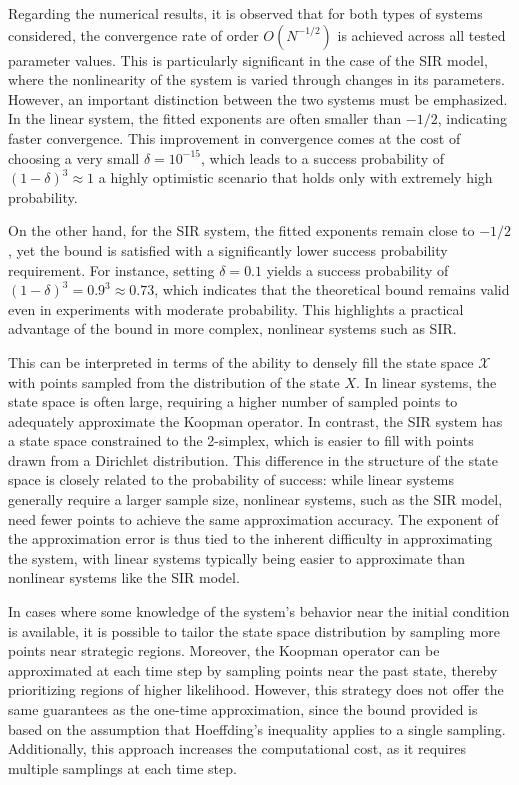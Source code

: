 \documentclass{article}
\begin{document}
Regarding the numerical results, it is observed that for both types of systems considered, the convergence rate of order $O(N^{-1/2})$ is achieved across all tested parameter values. This is particularly significant in the case of the SIR model, where the nonlinearity of the system is varied through changes in its parameters. However, an important distinction between the two systems must be emphasized. In the linear system, the fitted exponents are often smaller than $-1/2$, indicating faster convergence. This improvement in convergence comes at the cost of choosing a very small $\delta = 10^{-15}$, which leads to a success probability of $(1 - \delta)^3 \approx 1$ a highly optimistic scenario that holds only with extremely high probability.

On the other hand, for the SIR system, the fitted exponents remain close to $-1/2$, yet the bound is satisfied with a significantly lower success probability requirement. For instance, setting $\delta = 0.1$ yields a success probability of $(1 - \delta)^3 = 0.9^3 \approx 0.73$, which indicates that the theoretical bound remains valid even in experiments with moderate probability. This highlights a practical advantage of the bound in more complex, nonlinear systems such as SIR.

This can be interpreted in terms of the ability to densely fill the state space $\mathcal{X}$ with points sampled from the distribution of the state $X$. In linear systems, the state space is often large, requiring a higher number of sampled points to adequately approximate the Koopman operator. In contrast, the SIR system has a state space constrained to the 2-simplex, which is easier to fill with points drawn from a Dirichlet distribution. This difference in the structure of the state space is closely related to the probability of success: while linear systems generally require a larger sample size, nonlinear systems, such as the SIR model, need fewer points to achieve the same approximation accuracy. The exponent of the approximation error is thus tied to the inherent difficulty in approximating the system, with linear systems typically being easier to approximate than nonlinear systems like the SIR model.

In cases where some knowledge of the system's behavior near the initial condition is available, it is possible to tailor the state space distribution by sampling more points near strategic regions. Moreover, the Koopman operator can be approximated at each time step by sampling points near the past state, thereby prioritizing regions of higher likelihood. However, this strategy does not offer the same guarantees as the one-time approximation, since the bound provided is based on the assumption that Hoeffding’s inequality applies to a single sampling. Additionally, this approach increases the computational cost, as it requires multiple samplings at each time step.
\end{document}
